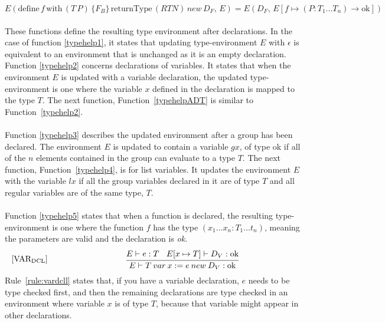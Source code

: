  \begin{equation} \label{typehelp5}
     E(\text{define} \, f \, \text{with} \, (T \, P) \, \{F_B\} \, \text{returnType} \, (RTN) \, new \, D_F, \, E) = E(D_F, \, E[f \mapsto (P:T_1...T_n) \xrightarrow{}\text{ok}])
 \end{equation}
\\
These functions define the resulting type environment after declarations. In the case of function \ref{typehelp1}, it states that updating type-environment $E$ with $\epsilon$ is equivalent to an environment that is unchanged as it is an empty declaration. Function \ref{typehelp2} concerns declarations of variables. It states that when the environment $E$ is updated with a variable declaration, the updated type-environment is one where the variable $x$ defined in the declaration is mapped to the type $T$. The next function, Function~\ref{typehelpADT} is similar to Function~\ref{typehelp2}.
\\\\
Function \ref{typehelp3} describes the updated environment after a group has been declared. The environment $E$ is updated to contain a variable $gx$, of type ok if all of the $n$ elements contained in the group can evaluate to a type $T$. The next function, Function~\ref{typehelp4}, is for list variables. It updates the environment $E$ with the variable $lx$ if all the group variables declared in it are of type $T$ and all regular variables are of the same type, $T$.
\\\\
Function \ref{typehelp5} states that when a function is declared, the resulting type-environment is one where the function $f$ has the type $(x_1...x_n : T_1...t_n)$, meaning the parameters are valid and the declaration is \textit{ok}.
\begin{equation}\label{rule:vardcll}
\begin{minipage}{.2\linewidth}
$[\text{VAR}_\text{DCL}]$
\end{minipage}
\begin{minipage}{.8\linewidth}
\centering
$\cfrac{E \vdash e : T \: \: \: \: E[x \mapsto T] \vdash D_V : \text{ok}} {E \vdash T \: var \: x := e \: new \: D_V : \text{ok}}$
\end{minipage}
\end{equation}
Rule~\ref{rule:vardcll} states that, if you have a variable declaration, $e$ needs to be type checked first, and then the remaining declarations are type checked in an environment where variable $x$ is of type $T$, because that variable might appear in other declarations. 

